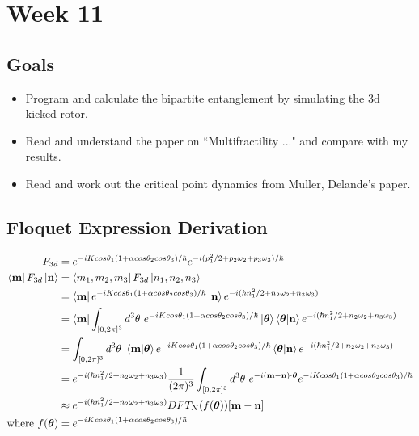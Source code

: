 \documentclass[12pt]{article}
\begin{document}
\section{Week 11}
\subsection{Goals}
\begin{itemize}
    \item Program and calculate the bipartite entanglement
    by simulating the 3d kicked rotor.

    \item Read and understand the paper on ``Multifractility ..."
    and compare with my results.

    \item Read and work out the critical point dynamics from
    Muller, Delande's paper.
\end{itemize}

\subsection{Floquet Expression Derivation}

\begin{align*}
    F_{3d} &= e^{-i K cos\theta_1 (1 + \alpha cos\theta_2 cos\theta_3) / \hbar}
    e^{-i (p_1^2 / 2 + p_2 \omega_2 + p_3 \omega_3)/\hbar} \\
    \bra{\mathbf{m}} F_{3d} \ket{\mathbf{n}} &=
    \bra{m_1, m_2, m_3}F_{3d}\ket{n_1, n_2, n_3} \\
    &= \bra{\mathbf{m}}
    e^{-i K cos\theta_1 (1 + \alpha cos\theta_2 cos\theta_3) / \hbar}
    \ket{\mathbf{n}} e^{-i (\hbar n_1^2 / 2 + n_2 \omega_2 + n_3 \omega_3)} \\
    &= \bra{\mathbf{m}} \int_{[0,2\pi]^3} d^3\theta \
    e^{-i K cos\theta_1 (1 + \alpha cos\theta_2 cos\theta_3) / \hbar}
    \ket{\boldsymbol{\theta}}\braket{\boldsymbol{\theta}|\mathbf{n}}
    e^{-i (\hbar n_1^2 / 2 + n_2 \omega_2 + n_3 \omega_3)} \\
    &= \int_{[0,2\pi]^3} d^3\theta \ \braket{\mathbf{m}|\boldsymbol{\theta}}
    e^{-i K cos\theta_1 (1 + \alpha cos\theta_2 cos\theta_3) / \hbar}
    \braket{\boldsymbol{\theta}|\mathbf{n}}
    e^{-i (\hbar n_1^2 / 2 + n_2 \omega_2 + n_3 \omega_3)} \\
    &= e^{-i (\hbar n_1^2 / 2 + n_2 \omega_2 + n_3 \omega_3)}
    \frac{1}{(2\pi)^3} \int_{[0,2\pi]^3} d^3\theta \
    e^{-i(\mathbf{m} - \mathbf{n})\cdot \boldsymbol{\theta}}
    e^{-i K cos\theta_1 (1 + \alpha cos\theta_2 cos\theta_3) / \hbar}\\
    &\approx e^{-i (\hbar n_1^2 / 2 + n_2 \omega_2 + n_3 \omega_3)}
    DFT_N(f(\boldsymbol{\theta}))[\mathbf{m} - \mathbf{n}]\\
    \text{where }
    f(\boldsymbol{\theta}) &=
    e^{-i K cos\theta_1 (1 + \alpha cos\theta_2 cos\theta_3) / \hbar}
\end{align*}
\end{document}
